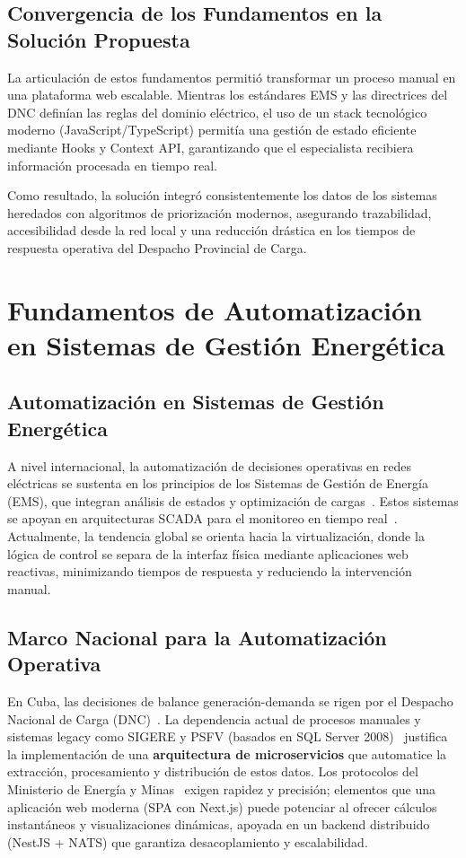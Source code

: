 \subsection{Convergencia de los Fundamentos en la Solución Propuesta}
La articulación de estos fundamentos permitió transformar un proceso manual en una plataforma web escalable. Mientras los estándares EMS y las directrices del DNC definían las reglas del dominio eléctrico, el uso de un stack tecnológico moderno (JavaScript/TypeScript) permitía una gestión de estado eficiente mediante Hooks y Context API, garantizando que el especialista recibiera información procesada en tiempo real.

Como resultado, la solución integró consistentemente los datos de los sistemas heredados con algoritmos de priorización modernos, asegurando trazabilidad, accesibilidad desde la red local y una reducción drástica en los tiempos de respuesta operativa del Despacho Provincial de Carga.

\section{Fundamentos de Automatización en Sistemas de Gestión Energética}

\subsection{Automatización en Sistemas de Gestión Energética}
A nivel internacional, la automatización de decisiones operativas en redes eléctricas se sustenta en los principios de los Sistemas de Gestión de Energía (EMS), que integran análisis de estados y optimización de cargas~\citep{gomez2016}. Estos sistemas se apoyan en arquitecturas SCADA para el monitoreo en tiempo real~\citep{ansi2018}. Actualmente, la tendencia global se orienta hacia la virtualización, donde la lógica de control se separa de la interfaz física mediante aplicaciones web reactivas, minimizando tiempos de respuesta y reduciendo la intervención manual.

\subsection{Marco Nacional para la Automatización Operativa}
En Cuba, las decisiones de balance generación-demanda se rigen por el Despacho Nacional de Carga (DNC)~\citep{union2023}. La dependencia actual de procesos manuales y sistemas legacy como SIGERE y PSFV (basados en SQL Server 2008)~\citep{cujae2021} justifica la implementación de una \textbf{arquitectura de microservicios} que automatice la extracción, procesamiento y distribución de estos datos. Los protocolos del Ministerio de Energía y Minas~\citep{ministerio2023} exigen rapidez y precisión; elementos que una aplicación web moderna (SPA con Next.js) puede potenciar al ofrecer cálculos instantáneos y visualizaciones dinámicas, apoyada en un backend distribuido (NestJS + NATS) que garantiza desacoplamiento y escalabilidad.

